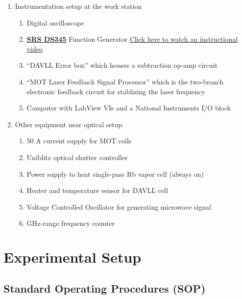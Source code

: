 \documentclass{../lab}
\begin{document}
\begin{enumerate}
    \item Instrumentation setup at the work station
    \begin{enumerate}
        \item Digital oscilloscope
        \item \href{http://physics111.lib.berkeley.edu/Physics111/Equipment_Manuals/JOS/DS345m.pdf}{\textbf{SRS DS345}} Function Generator \href{https://youtu.be/PrM8DHFOFS0}{Click here to watch an instructional video}
        \item ``DAVLL Error box'' which houses a subtraction op-amp circuit
        \item ``MOT Laser Feedback Signal Processor'' which is the two-branch electronic feedback circuit for stablizing the laser frequency
        \item Computer with LabView VIs and a National Instruments I/O block
    \end{enumerate}
    
    \item Other equipment near optical setup
    \begin{enumerate}
        \item 50 A current supply for MOT coils
        \item Uniblitz optical shutter controller
        \item Power supply to heat single-pass Rb vapor cell (always on)
        \item Heater and temperature sensor for DAVLL cell
        \item Voltage Controlled Oscillator for generating microwave signal
        \item GHz-range frequency counter
    \end{enumerate}
\end{enumerate}

\section{Experimental Setup}


\subsection{Standard Operating Procedures (SOP)}
\end{document}
